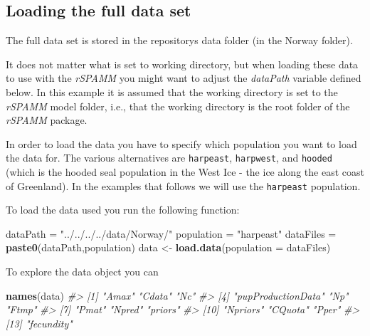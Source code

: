 \documentclass[
]{article}
\newenvironment{Shaded}{\begin{snugshade}}{\end{snugshade}}
\newcommand{\CommentTok}[1]{\textcolor[rgb]{0.56,0.35,0.01}{\textit{#1}}}
\newcommand{\DataTypeTok}[1]{\textcolor[rgb]{0.13,0.29,0.53}{#1}}
\newcommand{\KeywordTok}[1]{\textcolor[rgb]{0.13,0.29,0.53}{\textbf{#1}}}
\newcommand{\NormalTok}[1]{#1}
\newcommand{\StringTok}[1]{\textcolor[rgb]{0.31,0.60,0.02}{#1}}
\begin{document}
\hypertarget{loading-the-full-data-set}{%
\subsection{Loading the full data set}\label{loading-the-full-data-set}}

The full data set is stored in the repositorys data folder (in the
Norway folder).

It does not matter what is set to working directory, but when loading
these data to use with the \emph{rSPAMM} you might want to adjust the
\emph{dataPath} variable defined below. In this example it is assumed
that the working directory is set to the \emph{rSPAMM} model folder,
i.e., that the working directory is the root folder of the \emph{rSPAMM}
package.

In order to load the data you have to specify which population you want
to load the data for. The various alternatives are \texttt{harpeast},
\texttt{harpwest}, and \texttt{hooded} (which is the hooded seal
population in the West Ice - the ice along the east coast of Greenland).
In the examples that follows we will use the \texttt{harpeast}
population.

To load the data used you run the following function:

\begin{Shaded}
\begin{Highlighting}[]
\NormalTok{dataPath =}\StringTok{ "../../../../data/Norway/"}
\NormalTok{population =}\StringTok{ "harpeast"}
\NormalTok{dataFiles =}\StringTok{ }\KeywordTok{paste0}\NormalTok{(dataPath,population)}
\NormalTok{data <-}\StringTok{ }\KeywordTok{load.data}\NormalTok{(}\DataTypeTok{population =}\NormalTok{ dataFiles)}
\end{Highlighting}
\end{Shaded}

To explore the data object you can

\begin{Shaded}
\begin{Highlighting}[]
\KeywordTok{names}\NormalTok{(data)}
\CommentTok{#>  [1] "Amax"              "Cdata"             "Nc"               }
\CommentTok{#>  [4] "pupProductionData" "Np"                "Ftmp"             }
\CommentTok{#>  [7] "Pmat"              "Npred"             "priors"           }
\CommentTok{#> [10] "Npriors"           "CQuota"            "Pper"             }
\CommentTok{#> [13] "fecundity"}
\end{Highlighting}
\end{Shaded}
\end{document}
